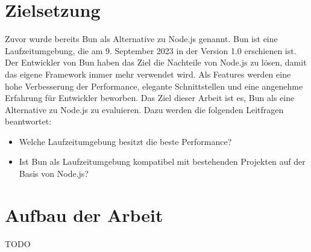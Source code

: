 \section{Zielsetzung}
Zuvor wurde bereits Bun als Alternative zu Node.js genannt. Bun ist eine Laufzeitumgebung, die am 9. September 2023 in der Version 1.0 erschienen ist. Der Entwickler von Bun
haben das Ziel die Nachteile von Node.js zu lösen, damit das eigene Framework immer mehr verwendet wird.
Als Features werden eine hohe Verbesserung der Performance, elegante Schnittstellen und eine angenehme Erfahrung für Entwickler beworben.
Das Ziel dieser Arbeit ist es, Bun als eine Alternative zu Node.js zu evaluieren. Dazu werden die folgenden Leitfragen beantwortet: 
\begin{itemize}
    \item Welche Laufzeitumgebung besitzt die beste Performance?
    \item Ist Bun als Laufzeitumgebung kompatibel mit bestehenden Projekten auf der Basis von Node.js?
\end{itemize}
   
\section{Aufbau der Arbeit}
TODO


